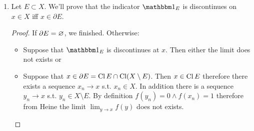 \documentclass[a4paper]{article}
\begin{document}
\begin{enumerate}
\begin{proof}
\begin{itemize}
\[\begin{cases}
					\cg_n(2^{n}x - 1) & x \in \csb{\frac{1}{2^{n}}, \frac{1}{2^{n - 1}}}
				\end{cases} \]
				Note that this is well-defined as if $x = \frac{1}{2^{n}}$ then $\cg_n(2^{n}x - 1) = \cg_n(0) = \cg_{n + 1}(1) = \cg_{n + 1}(2^{n + 1}x - 1)$. For this reason $\cg$ is also continues and for each $n \neq 0, 1$ we get that $\cg(2^{-n}) = x_n$. Since $\cg$ is continues and we have partial limit of $x_0$, $\cg$ must converge to $x_0$ for $t \to 0^{+}$. Now $\lim_{t \to 0^{+}}f(\cg(t)) = y$ therefore $f(\cg(\frac{1}{2^{n}})) = f(x_n)$ must converge to $y$ too, as intended. 
			\end{itemize}
		\end{proof}
		
		\item Let $E \subset X$. We'll prove that the indicator $\one_E$ is discontinues on $x \in X$ iff $x \in \partial E$. \begin{proof}
			If $\partial E = \varnothing$, we finished. Otherwise: 
			\begin{itemize}
				\item[$\implies$]Suppose that $\one_E$ is discontinues at $x$. Then either the limit does not exists or 
				\item[$\impliedby$]Suppose that $x \in \partial E = \operatorname{Cl} E \cap \operatorname{Cl}(X \setminus E)$. Then $x \in \operatorname{Cl} E$ therefore there exists a sequence $x_n \to x$ s.t. $x_n \in X$. In addition there is a sequence $y_n \to x$ s.t. $y_n \in X \setminus E$. By definition $f(y_n) = 0 \land f(x_n) = 1$ therefore from Heine the limit $\lim_{y \to x}f(y)$ does not exists. 
			\end{itemize}
		\end{proof}
		

\end{enumerate}
\end{document}
